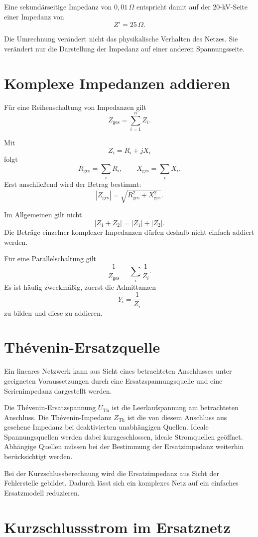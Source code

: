 Eine sekundärseitige Impedanz von \(0{,}01\,\Omega\) entspricht damit
auf der 20-kV-Seite einer Impedanz von
\[
  Z'=25\,\Omega.
\]

Die Umrechnung verändert nicht das physikalische Verhalten des Netzes.
Sie verändert nur die Darstellung der Impedanz auf einer anderen
Spannungsseite.

\section{Komplexe Impedanzen addieren}

Für eine Reihenschaltung von Impedanzen gilt
\[
  Z_{\mathrm{ges}}=\sum_{i=1}^{n}Z_i.
\]

Mit
\[
  Z_i=R_i+jX_i
\]
folgt
\[
  R_{\mathrm{ges}}=\sum_i R_i,\qquad
  X_{\mathrm{ges}}=\sum_i X_i.
\]
Erst anschließend wird der Betrag bestimmt:
\[
  |Z_{\mathrm{ges}}|=
  \sqrt{R_{\mathrm{ges}}^2+X_{\mathrm{ges}}^2}.
\]

Im Allgemeinen gilt nicht
\[
  |Z_1+Z_2|=|Z_1|+|Z_2|.
\]
Die Beträge einzelner komplexer Impedanzen dürfen deshalb nicht einfach
addiert werden.

Für eine Parallelschaltung gilt
\[
  \frac{1}{Z_{\mathrm{ges}}}=\sum_i\frac{1}{Z_i}.
\]
Es ist häufig zweckmäßig, zuerst die Admittanzen
\[
  Y_i=\frac{1}{Z_i}
\]
zu bilden und diese zu addieren.

\section{Thévenin-Ersatzquelle}

Ein lineares Netzwerk kann aus Sicht eines betrachteten Anschlusses unter
geeigneten Voraussetzungen durch eine Ersatzspannungsquelle und eine
Serienimpedanz dargestellt werden.

Die Thévenin-Ersatzspannung \(U_{\mathrm{Th}}\) ist die Leerlaufspannung
am betrachteten Anschluss. Die Thévenin-Impedanz \(Z_{\mathrm{Th}}\)
ist die von diesem Anschluss aus gesehene Impedanz bei deaktivierten
unabhängigen Quellen. Ideale Spannungsquellen werden dabei kurzgeschlossen,
ideale Stromquellen geöffnet. Abhängige Quellen müssen bei der Bestimmung
der Ersatzimpedanz weiterhin berücksichtigt werden.

Bei der Kurzschlussberechnung wird die Ersatzimpedanz aus Sicht der
Fehlerstelle gebildet. Dadurch lässt sich ein komplexes Netz auf ein
einfaches Ersatzmodell reduzieren.

\section{Kurzschlussstrom im Ersatznetz}

